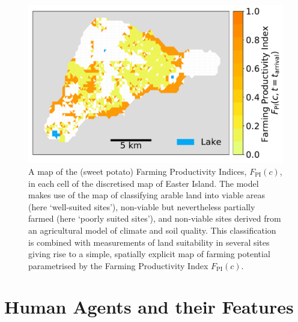\begin{figure}
	\centering
	\includegraphics[width=\textwidth]{images/Plot_F_PI_c.pdf}
	\caption{A map of the (sweet potato) Farming Productivity Indices, $F_\text{PI}(c)$, in each cell of the discretised map of Easter Island. The model makes use of the map of \citet{Puleston2017} classifying arable land into viable areas (here `well-suited sites'), non-viable but nevertheless partially farmed (here `poorly suited sites'), and non-viable sites derived from an agricultural model of climate and soil quality. 
	This classification is combined with measurements of land suitability in several sites \citep{Louwagie2006} giving rise to a simple, spatially explicit map of farming potential parametrised by the Farming Productivity Index $F_\text{PI}(c)$.}
	\label{fig:Map_agric}
\end{figure}


\FloatBarrier
\section{Human Agents and their Features}\label{sec:agentprops}
